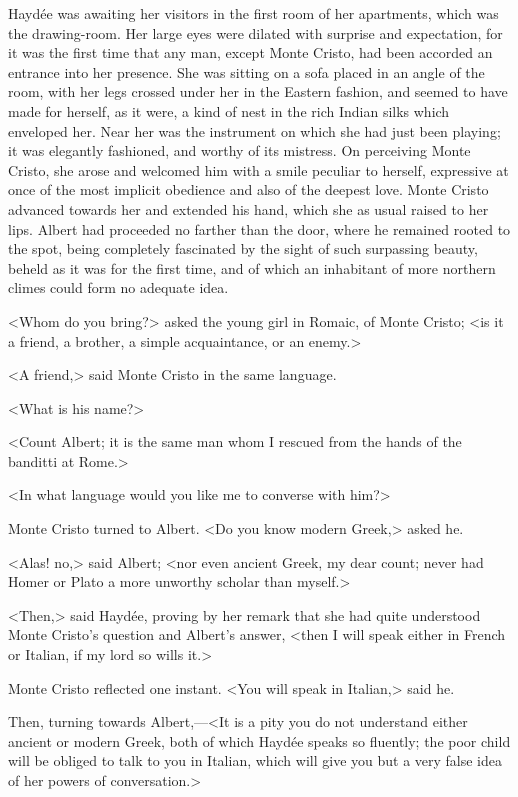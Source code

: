  Haydée was awaiting her visitors in the first room of her apartments, which was the drawing-room. Her large eyes were dilated with surprise and expectation, for it was the first time that any man, except Monte Cristo, had been accorded an entrance into her presence. She was sitting on a sofa placed in an angle of the room, with her legs crossed under her in the Eastern fashion, and seemed to have made for herself, as it were, a kind of nest in the rich Indian silks which enveloped her. Near her was the instrument on which she had just been playing; it was elegantly fashioned, and worthy of its mistress. On perceiving Monte Cristo, she arose and welcomed him with a smile peculiar to herself, expressive at once of the most implicit obedience and also of the deepest love. Monte Cristo advanced towards her and extended his hand, which she as usual raised to her lips.  Albert had proceeded no farther than the door, where he remained rooted to the spot, being completely fascinated by the sight of such surpassing beauty, beheld as it was for the first time, and of which an inhabitant of more northern climes could form no adequate idea. 

 <Whom do you bring?> asked the young girl in Romaic, of Monte Cristo; <is it a friend, a brother, a simple acquaintance, or an enemy.> 

 <A friend,> said Monte Cristo in the same language. 

 <What is his name?> 

 <Count Albert; it is the same man whom I rescued from the hands of the banditti at Rome.> 

 <In what language would you like me to converse with him?> 

 Monte Cristo turned to Albert. <Do you know modern Greek,> asked he. 

 <Alas! no,> said Albert; <nor even ancient Greek, my dear count; never had Homer or Plato a more unworthy scholar than myself.> 

 <Then,> said Haydée, proving by her remark that she had quite understood Monte Cristo's question and Albert's answer, <then I will speak either in French or Italian, if my lord so wills it.> 

 Monte Cristo reflected one instant. <You will speak in Italian,> said he. 

 Then, turning towards Albert,—<It is a pity you do not understand either ancient or modern Greek, both of which Haydée speaks so fluently; the poor child will be obliged to talk to you in Italian, which will give you but a very false idea of her powers of conversation.> 

